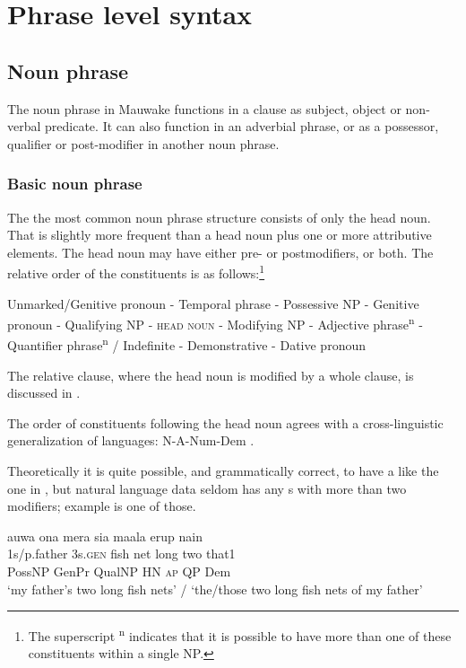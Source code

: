 
\chapter{Phrase level syntax}
{}
\section{Noun phrase}
{}
The noun phrase in Mauwake functions in a clause as subject, object or non-verbal predicate. It can also function in an adverbial phrase, or as a possessor, qualifier or post-modifier in another noun phrase.

\subsection{Basic noun phrase} \label{sec:4.1.1}
{}
The the most common noun phrase structure consists of only the head noun. That is slightly more frequent than a head noun plus one or more attributive elements. The head noun may have either pre- or postmodifiers, or both. The relative order of the  constituents is as follows:\footnote{The superscript \textsuperscript{n} indicates that it is possible to have more than one of these constituents within a single NP.}

\ea
Unmarked/Genitive pronoun - Temporal phrase - Possessive NP - Genitive pronoun - Qualifying NP - \textsc{head} \textsc{noun} - Modifying NP - Adjective phrase\textsuperscript{n} - Quantifier phrase\textsuperscript{n} / Indefinite - Demonstrative - Dative pronoun
\z

The relative clause, where the head noun is modified by a whole clause, is discussed in .

The order of  constituents following the head noun agrees with a cross-linguistic generalization of  languages:  N-A-Num-Dem \citep[112]{Dryer2007a}.

Theoretically it is quite possible, and grammatically correct, to have a  like the one in , but natural language data seldom has any s with more than two modifiers; example  is one of those.
 

\ea%
\label{ex:4:x392}
\glll auwa  ona  mera  sia  maala  erup  nain \\
1s/p.father  3s.\textsc{gen}  fish  net  long  two  that1\\
PossNP  GenPr  QualNP  HN  \textsc{ap}  QP  Dem \\
\glt `my father's two long fish nets' / `the/those two long fish nets of my father'
\z

